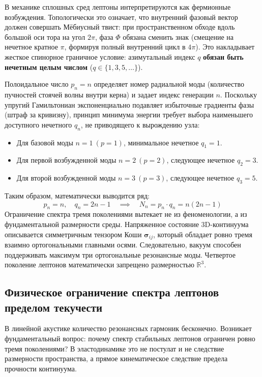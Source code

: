 \documentclass[12pt,a4paper]{article}
\begin{document}
	В механике сплошных сред лептоны интерпретируются как фермионные возбуждения. Топологически это означает, что внутренний фазовый вектор должен совершать Мёбиусный твист: при пространственном обходе вдоль большой оси тора на угол $2\pi$, фаза $\Phi$ обязана сменить знак (смещение на нечетное кратное $\pi$, формируя полный внутренний цикл в $4\pi$). Это накладывает жесткое спинорное граничное условие: азимутальный индекс $q$ \textbf{обязан быть нечетным целым числом} ($q \in \{1, 3, 5, \dots\}$).
	
	Полоидальное число $p_n = n$ определяет номер радиальной моды (количество пучностей стоячей волны внутри керна) и задает индекс генерации $n$. Поскольку упругий Гамильтониан экспоненциально подавляет избыточные градиенты фазы (штраф за кривизну), принцип минимума энергии требует выбора наименьшего доступного нечетного $q_n$, не приводящего к вырождению узла:
	\begin{itemize}
		\item Для базовой моды $n=1 \ (p=1)$, минимальное нечетное $q_1 = 1$.
		\item Для первой возбужденной моды $n=2 \ (p=2)$, следующее нечетное $q_2 = 3$.
		\item Для второй возбужденной моды $n=3 \ (p=3)$, следующее нечетное $q_3 = 5$.
	\end{itemize}
	Таким образом, математически выводится ряд:
	\begin{equation}
		p_n = n, \quad q_n = 2n - 1 \quad \implies \quad N_n = p_n \cdot q_n = n(2n-1)
	\end{equation}
	Ограничение спектра тремя поколениями вытекает не из феноменологии, а из фундаментальной размерности среды. Напряженное состояние 3D-континуума описывается симметричным тензором Коши $\boldsymbol{\sigma}_{ij}$, который обладает ровно тремя взаимно ортогональными главными осями. Следовательно, вакуум способен поддерживать максимум три ортогональные резонансные моды. Четвертое поколение лептонов математически запрещено размерностью $\mathbb{R}^3$.
	
	\subsection{Физическое ограничение спектра лептонов пределом текучести}
	В линейной акустике количество резонансных гармоник бесконечно. Возникает фундаментальный вопрос: почему спектр стабильных лептонов ограничен ровно тремя поколениями? В эластодинамике это не постулат и не следствие размерности пространства, а прямое кинематическое следствие предела прочности континуума.
	
\end{document}
